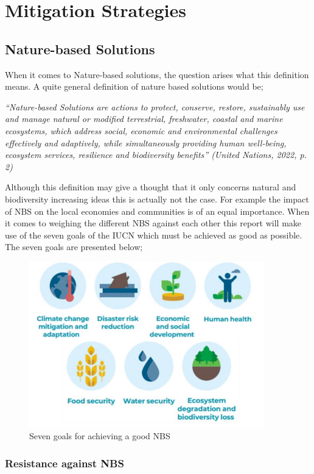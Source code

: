 \chapter{Mitigation Strategies}


\section{Nature-based Solutions}

When it comes to Nature-based solutions, the question arises what this definition means. A quite general definition of nature based solutions would be;

\textit{“Nature-based Solutions are actions to protect, conserve, restore, sustainably
use and manage natural or modified terrestrial, freshwater, coastal and marine
ecosystems, which address social, economic and environmental challenges
effectively and adaptively, while simultaneously providing human well-being,
ecosystem services, resilience and biodiversity benefits” (United Nations, 2022,
p. 2)}

Although this definition may give a thought that it only concerns natural and biodiversity increasing ideas this is actually not the case. For example the impact of NBS on the local economies and communities is of an equal importance. When it comes to weighing the different NBS against each other this report will make use of the seven goals of the IUCN which must be achieved as good as possible. The seven goals are presented below;

\begin{figure}[H]
    \centering
    \includegraphics[width=0.50\linewidth]{figures/ThesevenNBSgoals.png}
    \caption{Seven goals for achieving a good NBS}
    \label{fig:placeholder}
\end{figure}

\subsection{Resistance against NBS}

